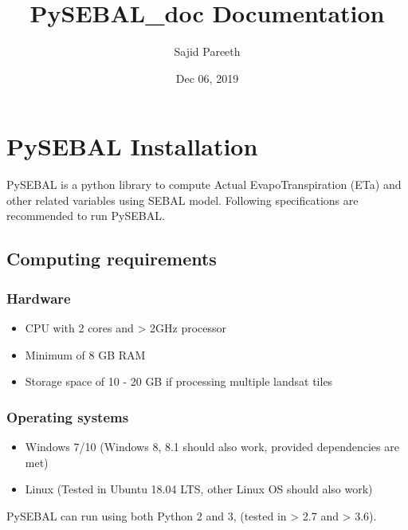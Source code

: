 \documentclass[letterpaper,10pt,english]{sphinxmanual}
\title{PySEBAL\_doc Documentation}
\date{Dec 06, 2019}
\author{Sajid Pareeth}
\begin{document}
\pagestyle{empty}
\sphinxmaketitle
\pagestyle{plain}
\sphinxtableofcontents
\pagestyle{normal}
\label{\detokenize{index::doc}}



\chapter{PySEBAL Installation}
\label{\detokenize{installation:pysebal-installation}}\label{\detokenize{installation::doc}}
PySEBAL is a python library to compute Actual EvapoTranspiration (ETa) and other related variables using SEBAL model. Following specifications are recommended to run PySEBAL.


\section{Computing requirements}
\label{\detokenize{installation:computing-requirements}}

\subsection{Hardware}
\label{\detokenize{installation:hardware}}\begin{itemize}
\item {} 
CPU with 2 cores and \textgreater{} 2GHz processor

\item {} 
Minimum of 8 GB RAM

\item {} 
Storage space of 10 - 20 GB if processing multiple landsat tiles

\end{itemize}


\subsection{Operating systems}
\label{\detokenize{installation:operating-systems}}\begin{itemize}
\item {} 
Windows 7/10 (Windows 8, 8.1 should also work, provided dependencies are met)

\item {} 
Linux (Tested in Ubuntu 18.04 LTS, other Linux OS should also work)

\end{itemize}

PySEBAL can run using both Python 2 and 3, (tested in \textgreater{} 2.7 and \textgreater{} 3.6).
\end{document}
